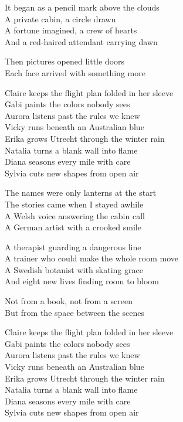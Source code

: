 \begin{lyrics}
It began as a pencil mark above the clouds\\
A private cabin, a circle drawn\\
A fortune imagined, a crew of hearts\\
And a red-haired attendant carrying dawn

Then pictures opened little doors\\
Each face arrived with something more

Claire keeps the flight plan folded in her sleeve\\
Gabi paints the colors nobody sees\\
Aurora listens past the rules we knew\\
Vicky runs beneath an Australian blue\\
Erika grows Utrecht through the winter rain\\
Natalia turns a blank wall into flame\\
Diana seasons every mile with care\\
Sylvia cuts new shapes from open air

The names were only lanterns at the start\\
The stories came when I stayed awhile\\
A Welsh voice answering the cabin call\\
A German artist with a crooked smile

A therapist guarding a dangerous line\\
A trainer who could make the whole room move\\
A Swedish botanist with skating grace\\
And eight new lives finding room to bloom

Not from a book, not from a screen\\
But from the space between the scenes

Claire keeps the flight plan folded in her sleeve\\
Gabi paints the colors nobody sees\\
Aurora listens past the rules we knew\\
Vicky runs beneath an Australian blue\\
Erika grows Utrecht through the winter rain\\
Natalia turns a blank wall into flame\\
Diana seasons every mile with care\\
Sylvia cuts new shapes from open air


\end{lyrics}

